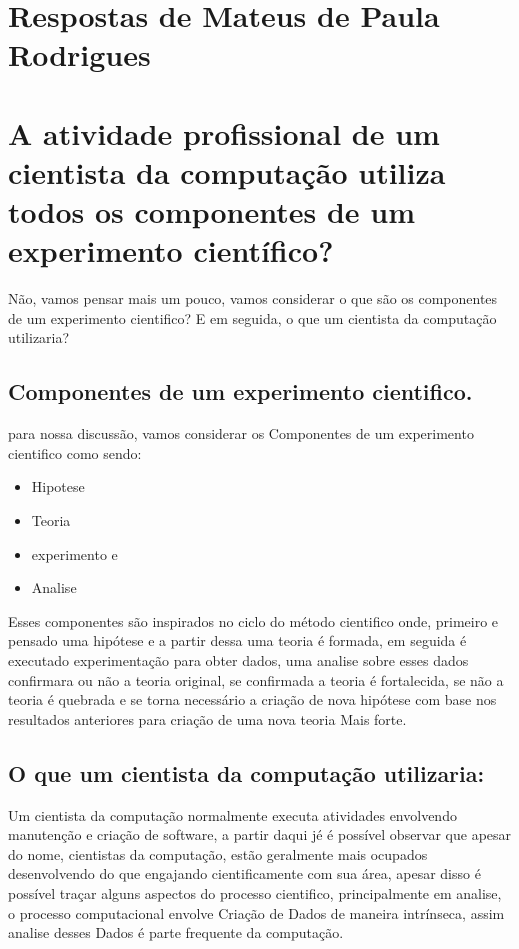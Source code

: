 \section{Respostas de Mateus de Paula Rodrigues\label{tarefa-MoustacheGolem-componentes-eperimento}}

\section{A atividade profissional de um cientista da computação
utiliza todos os componentes de um experimento científico?}

Não, vamos pensar mais um pouco,  vamos considerar o que são os componentes de um experimento cientifico? E em seguida, o que um cientista da computação utilizaria?

\subsection{Componentes de um experimento cientifico.}

para nossa discussão, vamos considerar os Componentes de um experimento cientifico como sendo:

\begin{itemize}
    \item \gls{Hipotese}
    \item Teoria
    \item \gls{experimento} e 
    \item Analise
\end{itemize}


Esses componentes são inspirados no ciclo do método cientifico onde, primeiro e pensado uma hipótese e a partir dessa uma teoria é formada, em seguida é executado experimentação para obter dados, uma analise sobre esses dados confirmara ou não a teoria original, se confirmada a teoria é fortalecida, se não a teoria é quebrada e se torna necessário a criação de nova hipótese com base nos resultados anteriores para criação de uma nova teoria Mais forte.

\subsection{O que um cientista da computação utilizaria:}
Um cientista da computação normalmente executa atividades envolvendo manutenção e criação de software, a partir daqui jé é possível observar que apesar do nome, cientistas da computação, estão geralmente mais ocupados desenvolvendo do que engajando cientificamente com sua área, apesar disso é possível traçar alguns aspectos do processo cientifico, principalmente em analise, o processo computacional envolve Criação de \gls{Dado}s de maneira intrínseca, assim analise desses Dados é parte frequente da computação.

